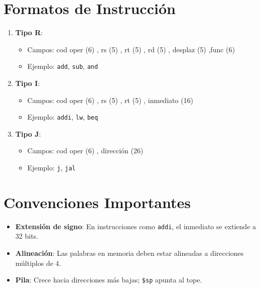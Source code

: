 \documentclass{article}
\begin{document}
\section*{Formatos de Instrucción}
\begin{enumerate}
    \item \textbf{Tipo R}:
    \begin{itemize}
        \item Campos: cod oper (6) , rs (5) , rt (5) , rd (5) , desplaz (5) ,func (6)
        \item Ejemplo: \verb|add|, \verb|sub|, \verb|and|
    \end{itemize}
    
    \item \textbf{Tipo I}:
    \begin{itemize}
        \item Campos: cod oper (6) , rs (5) , rt (5) , inmediato (16)
        \item Ejemplo: \verb|addi|, \verb|lw|, \verb|beq|
    \end{itemize}
    
    \item \textbf{Tipo J}:
    \begin{itemize}
        \item Campos: cod oper (6) , dirección (26)
        \item Ejemplo: \verb|j|, \verb|jal|
    \end{itemize}
\end{enumerate}

\section*{Convenciones Importantes}
\begin{itemize}
    \item \textbf{Extensión de signo}: En instrucciones como \verb|addi|, el inmediato se extiende a 32 bits.
    \item \textbf{Alineación}: Las palabras en memoria deben estar alineadas a direcciones múltiplos de 4.
    \item \textbf{Pila}: Crece hacia direcciones más bajas; \verb|$sp| apunta al tope.
\end{itemize}
\end{document}
